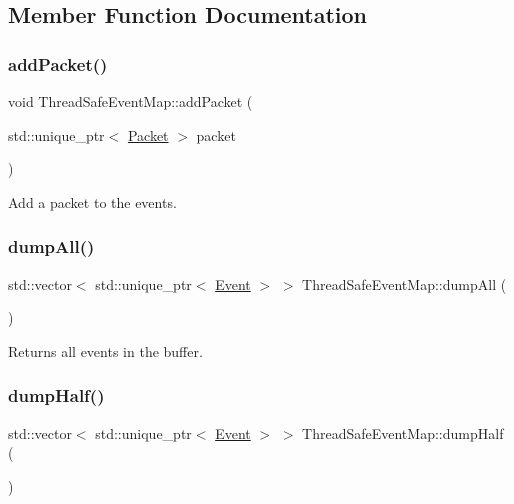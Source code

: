 \subsection{Member Function Documentation}
\mbox{\label{class_thread_safe_event_map_aafd485696f0a50da8afa864f04f0aa07}} 
\subsubsection{\texorpdfstring{add\+Packet()}{addPacket()}}
{\footnotesize\ttfamily void Thread\+Safe\+Event\+Map\+::add\+Packet (\begin{DoxyParamCaption}\item[{std\+::unique\+\_\+ptr$<$ \hyperlink{class_packet}{Packet} $>$}]{packet }\end{DoxyParamCaption})}



Add a packet to the events. 

\mbox{\label{class_thread_safe_event_map_af65f8dbd177f3db92d227b86839c275d}} 
\subsubsection{\texorpdfstring{dump\+All()}{dumpAll()}}
{\footnotesize\ttfamily std\+::vector$<$ std\+::unique\+\_\+ptr$<$ \hyperlink{class_event}{Event} $>$ $>$ Thread\+Safe\+Event\+Map\+::dump\+All (\begin{DoxyParamCaption}{ }\end{DoxyParamCaption})}



Returns all events in the buffer. 

\mbox{\label{class_thread_safe_event_map_a655bf86c67d1e8d0e8276b012f5fab8d}} 
\subsubsection{\texorpdfstring{dump\+Half()}{dumpHalf()}}
{\footnotesize\ttfamily std\+::vector$<$ std\+::unique\+\_\+ptr$<$ \hyperlink{class_event}{Event} $>$ $>$ Thread\+Safe\+Event\+Map\+::dump\+Half (\begin{DoxyParamCaption}{ }\end{DoxyParamCaption})}



